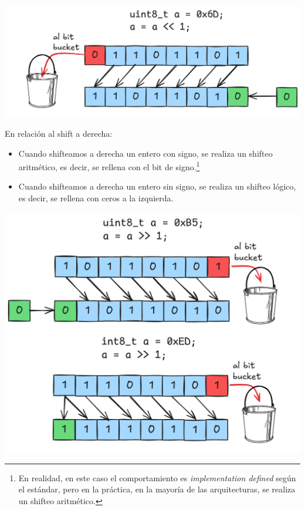 \documentclass[]{scrartcl}
\begin{document}
\begin{center}
  \includegraphics[scale=0.2]{./img/shift_left.png}  
  \label{fig:Shift_left}
\end{center}

En relación al shift a derecha:
\begin{itemize}
  \item Cuando shifteamos a derecha un entero con signo, se realiza un shifteo aritmético, es decir, se rellena con el bit de signo.\footnote{En realidad, en este caso el comportamiento es \textit{implementation defined} según el estándar, pero en la práctica, en la mayoría de las arquitecturas, se realiza un shifteo aritmético.}
  \item Cuando shifteamos a derecha un entero sin signo, se realiza un shifteo lógico, es decir, se rellena con ceros a la izquierda.
\end{itemize}

\begin{center}
  \includegraphics[scale=0.2]{./img/shift_right.png}  
  \label{fig:Shift_right}
\end{center}
\end{document}
